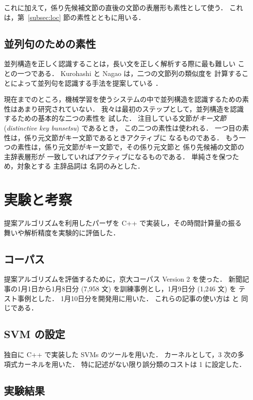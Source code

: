 \documentclass[japanese]{jnlp_1.2c}
\begin{document}
これに加えて，係り先候補文節の直後の文節の表層形も素性として使う．
これは，第~\ref{subsec:loc} 節の素性とともに用いる．


\subsection{並列句のための素性}
並列構造を正しく認識することは，長い文を正しく解析する際に最も難しい
ことの一つである．
Kurohashi と Nagao は，二つの文節列の類似度を
計算することによって並列句を認識する手法を提案している \cite{Kurohashi1994}．

現在までのところ，機械学習を使うシステムの中で並列構造を認識するための素性はあまり研究されていない．
我々は最初のステップとして，並列構造を認識するための基本的な二つの素性を
試した．
注目している文節が{\em キー文節} ({\it distinctive key bunsetsu}) 
\cite[page 510]{Kurohashi1994} であるとき，
この二つの素性は使われる．
一つ目の素性は，係り元文節がキー文節であるときアクティブに
なるものである．
もう一つの素性は，係り元文節がキー文節で，その係り元文節と
係り先候補の文節の
主辞表層形が
一致していればアクティブになるものである．
単純さを保つため，対象とする
主辞品詞は
名詞のみとした．


\section{実験と考察}
提案アルゴリズムを利用したパーザを C++ で実装し，その時間計算量の振る
舞いや解析精度を実験的に評価した．
\subsection{コーパス}
提案アルゴリズムを評価するために，京大コーパス 
Version 2 \cite{Kurohashi1998} を使った．
新聞記事の1月1日から1月8日分 (7,958 文) を訓練事例とし，1月9日分 (1,246 文) を
テスト事例とした．
1月10日分を開発用に用いた．
これらの記事の使い方は \cite{Uchimoto1999,Sekine2000Backward,Kudo2002} と
同じである．

\subsection{SVM の設定}
独自に C++ で実装した SVMs のツールを用いた．
カーネルとして，3 次の多項式カーネルを用いた．
特に記述がない限り誤分類のコストは 1 に設定した．

\subsection{実験結果}\label{subsec:results}
\end{document}
